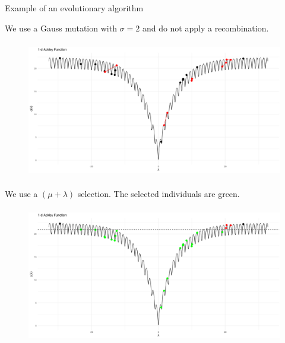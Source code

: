 \begin{frame}[allowframebreaks]{Example of an evolutionary algorithm}
\framebreak

We use a Gauss mutation with $\sigma = 2$ and do not apply a recombination.
 \begin{center}
    \begin{figure}
    \includegraphics[height=6cm]{images/ea_ex4.png}
    \end{figure}
    \end{center}

  \framebreak

We use a $(\mu + \lambda)$ selection. The selected individuals are green.

  \begin{center}
    \begin{figure}
      \includegraphics[height=6cm]{images/ea_ex5.png}
    \end{figure}
  \end{center}


\end{frame}


